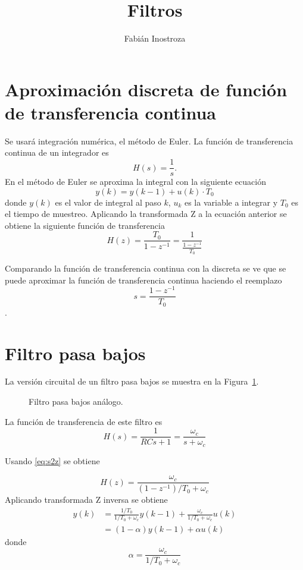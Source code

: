 \documentclass[11pt]{article} %
\title{Filtros}
\author{Fabián Inostroza}
\begin{document}
\maketitle

\section{Aproximación discreta de función de transferencia continua}
Se usará integración numérica, el método de Euler.
La función de transferencia continua de un integrador es
\[ H(s) = \frac{1}{s}. \]
En el método de Euler se aproxima la integral con la siguiente 
ecuación
\[ y(k) = y(k-1)+ u(k)\cdot T_0 \]
donde \( y(k) \) es el valor de integral al paso \( k \),
\( u_k \) es la variable a integrar y \( T_0 \) es el 
tiempo de muestreo. Aplicando la transformada Z a la ecuación 
anterior se obtiene la siguiente función de transferencia
\[ H(z) = \frac{T_0}{1-z^{-1}} = \frac{1}{ \frac{1-z^{-1}}{T_0} } \]

Comparando la función de transferencia continua con la 
discreta se ve que se puede aproximar la función de 
 transferencia continua haciendo el reemplazo 
\begin{equation}
s = \frac{1-z^{-1}}{T_0} \label{eq:s2z}
\end{equation}.
 
\section{Filtro pasa bajos}
La versión circuital de un filtro pasa bajos se muestra en la Figura~\ref{fig:LPF}.

\begin{figure}[h!tb]
\centering

\caption{Filtro pasa bajos análogo.}
\label{fig:LPF}
\end{figure}

La función de transferencia de este filtro es
\[ H(s) = \frac{1}{RCs+1} = \frac{\omega_c}{s+\omega_c} \]

Usando \eqref{eq:s2z} se obtiene

\[ H(z) = \frac{\omega_c}{(1-z^{-1})/T_0 + \omega_c} \]
Aplicando transformada Z inversa se obtiene
\begin{align*}
y(k) &= \frac{1/T_0}{1/T_0+\omega_c}y(k-1) + 
\frac{\omega_c}{1/T_0+\omega_c} u(k)  \\
	&= (1-\alpha)y(k-1) + \alpha u(k)
\end{align*}
donde
\[ \alpha = \frac{\omega_c}{1/T_0+\omega_c} \]
\end{document}
